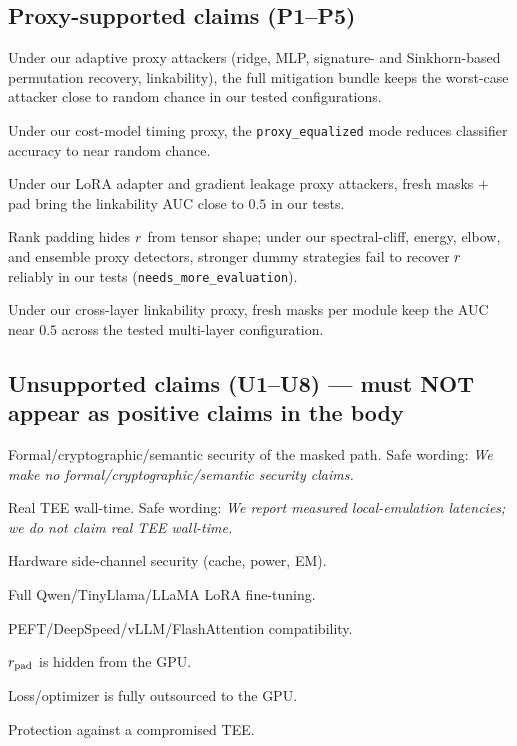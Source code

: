 \subsection*{Proxy-supported claims (P1--P5)}
\begin{description}[leftmargin=*, style=unboxed]
  \item[P1] Under our adaptive proxy attackers (ridge, MLP, signature- and Sinkhorn-based permutation recovery, linkability), the full mitigation bundle keeps the worst-case attacker close to random chance in our tested configurations.
  \item[P2] Under our cost-model timing proxy, the \texttt{proxy\_equalized} mode reduces classifier accuracy to near random chance.
  \item[P3] Under our LoRA adapter and gradient leakage proxy attackers, fresh masks $+$ pad bring the linkability AUC close to $0.5$ in our tests.
  \item[P4] Rank padding hides $r$ from tensor shape; under our spectral-cliff, energy, elbow, and ensemble proxy detectors, stronger dummy strategies fail to recover $r$ reliably in our tests (\texttt{needs\_more\_evaluation}).
  \item[P5] Under our cross-layer linkability proxy, fresh masks per module keep the AUC near $0.5$ across the tested multi-layer configuration.
\end{description}

\subsection*{Unsupported claims (U1--U8) --- must NOT appear as positive claims in the body}
\begin{description}[leftmargin=*, style=unboxed]
  \item[U1] Formal/cryptographic/semantic security of the masked path. Safe wording: \emph{We make no formal/cryptographic/semantic security claims.}
  \item[U2] Real TEE wall-time. Safe wording: \emph{We report measured local-emulation latencies; we do not claim real TEE wall-time.}
  \item[U3] Hardware side-channel security (cache, power, EM).
  \item[U4] Full Qwen/TinyLlama/LLaMA LoRA fine-tuning.
  \item[U5] PEFT/DeepSpeed/vLLM/FlashAttention compatibility.
  \item[U6] $r_{\mathrm{pad}}$ is hidden from the GPU.
  \item[U7] Loss/optimizer is fully outsourced to the GPU.
  \item[U8] Protection against a compromised TEE.
\end{description}

